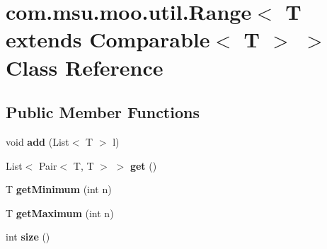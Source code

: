 \hypertarget{classcom_1_1msu_1_1moo_1_1util_1_1Range_3_01T_01extends_01Comparable_3_01T_01_4_01_4}{\section{com.\-msu.\-moo.\-util.\-Range$<$ T extends Comparable$<$ T $>$ $>$ Class Reference}
\label{classcom_1_1msu_1_1moo_1_1util_1_1Range_3_01T_01extends_01Comparable_3_01T_01_4_01_4}
}
\subsection*{Public Member Functions}
\begin{DoxyCompactItemize}
\item 
\hypertarget{classcom_1_1msu_1_1moo_1_1util_1_1Range_3_01T_01extends_01Comparable_3_01T_01_4_01_4_a34c556c5672d7b270a8fa0d33b61c97a}{void {\bfseries add} (List$<$ T $>$ l)}\label{classcom_1_1msu_1_1moo_1_1util_1_1Range_3_01T_01extends_01Comparable_3_01T_01_4_01_4_a34c556c5672d7b270a8fa0d33b61c97a}

\item 
\hypertarget{classcom_1_1msu_1_1moo_1_1util_1_1Range_3_01T_01extends_01Comparable_3_01T_01_4_01_4_a0dff5e8281b4940cdcb98803cd34906b}{List$<$ Pair$<$ T, T $>$ $>$ {\bfseries get} ()}\label{classcom_1_1msu_1_1moo_1_1util_1_1Range_3_01T_01extends_01Comparable_3_01T_01_4_01_4_a0dff5e8281b4940cdcb98803cd34906b}

\item 
\hypertarget{classcom_1_1msu_1_1moo_1_1util_1_1Range_3_01T_01extends_01Comparable_3_01T_01_4_01_4_a08c0a4badf7ee0296c2b73a8851af3d7}{T {\bfseries get\-Minimum} (int n)}\label{classcom_1_1msu_1_1moo_1_1util_1_1Range_3_01T_01extends_01Comparable_3_01T_01_4_01_4_a08c0a4badf7ee0296c2b73a8851af3d7}

\item 
\hypertarget{classcom_1_1msu_1_1moo_1_1util_1_1Range_3_01T_01extends_01Comparable_3_01T_01_4_01_4_ade94b2e3fe5ac0df02abd205bf23d90b}{T {\bfseries get\-Maximum} (int n)}\label{classcom_1_1msu_1_1moo_1_1util_1_1Range_3_01T_01extends_01Comparable_3_01T_01_4_01_4_ade94b2e3fe5ac0df02abd205bf23d90b}

\item 
\hypertarget{classcom_1_1msu_1_1moo_1_1util_1_1Range_3_01T_01extends_01Comparable_3_01T_01_4_01_4_ae8071b45d598a8802d7f40e72d376f8d}{int {\bfseries size} ()}\label{classcom_1_1msu_1_1moo_1_1util_1_1Range_3_01T_01extends_01Comparable_3_01T_01_4_01_4_ae8071b45d598a8802d7f40e72d376f8d}

\end{DoxyCompactItemize}
